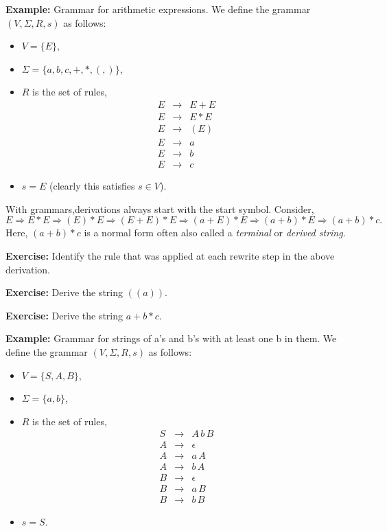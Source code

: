 \documentclass[a4paper,blends,pdf,colorBG,slideColor]{prosper}
\begin{document}

\small
{\bf Example:} Grammar for arithmetic expressions.  We define the grammar $(V,\Sigma, R, s)$ as follows:
\begin{itemize}
\item $V = \{ E \}$,
\item $\Sigma = \{ a, b, c, +, *, (, )\}$,
\item $R$ is the set of rules,
{\scriptsize
\[
\begin{array}{rcl}
E & \rightarrow & E + E \\
E & \rightarrow & E * E \\
E & \rightarrow & ( E )\\
E & \rightarrow & a\\
E & \rightarrow & b\\
E & \rightarrow & c
\end{array}
\]
}
\item $s = E$ (clearly this satisfies $s\in V$).
\end{itemize}
With grammars,derivations always start with the start symbol. Consider,
\[
E\Rightarrow E * E \Rightarrow ( E ) * E \Rightarrow ( E + E ) * E \Rightarrow (a + E) * E \Rightarrow (a + b) * E
\Rightarrow (a + b) * c.
\]
Here, $(a+b)*c$ is a normal form often also called a {\em terminal} or {\em derived string}.

\es


{\bf Exercise:} Identify the rule that was applied at each rewrite step in the above derivation.

{\bf Exercise:} Derive the string $((a))$.

{\bf Exercise:} Derive the string $a + b * c$.  

\es


\small
{\bf Example:} Grammar for strings of a's and b's with at least one b in them.  We define the grammar $(V,\Sigma, R, s)$ as follows:
\begin{itemize}
\item $V = \{ S,A,B \}$,
\item $\Sigma = \{ a, b\}$,
\item $R$ is the set of rules,
{\scriptsize
\[
\begin{array}{rcl}
S & \rightarrow & A\, b \, B\\
A & \rightarrow & \epsilon\\
A & \rightarrow & a\, A\\
A & \rightarrow & b\, A\\
B & \rightarrow & \epsilon\\
B & \rightarrow & a\, B\\
B & \rightarrow & b\, B
\end{array}
\]
}
\item $s = S$.
\end{itemize}
\end{document}
